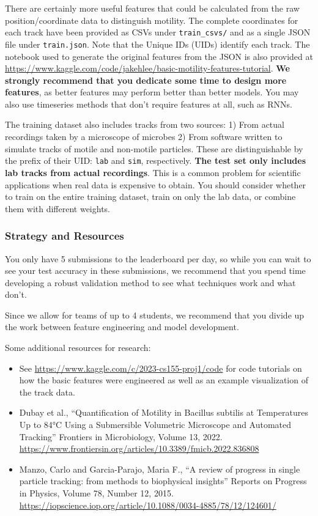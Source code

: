 There are certainly more useful features that could be calculated from the raw position/coordinate data to distinguish motility. The complete coordinates for each track have been provided as CSVs under \texttt{train_csvs/} and as a single JSON file under \texttt{train.json}. Note that the Unique IDs (UIDs) identify each track. The notebook used to generate the original features from the JSON is also provided at \url{https://www.kaggle.com/code/jakehlee/basic-motility-features-tutorial}. \textbf{We strongly recommend that you dedicate some time to design more features}, as better features may perform better than better models. You may also use timeseries methods that don't require features at all, such as RNNs.

The training dataset also includes tracks from two sources: 1) From actual recordings taken by a microscope of microbes 2) From software written to simulate tracks of motile and non-motile particles. These are distinguishable by the prefix of their UID: \texttt{lab} and \texttt{sim}, respectively. \textbf{The test set only includes lab tracks from actual recordings}. This is a common problem for scientific applications when real data is expensive to obtain. You should consider whether to train on the entire training dataset, train on only the lab data, or combine them with different weights.

\subsubsection{Strategy and Resources}

You only have 5 submissions to the leaderboard per day, so while you can wait to see your test accuracy in these submissions, we recommend that you spend time developing a robust validation method to see what techniques work and what don't.

Since we allow for teams of up to 4 students, we recommend that you divide up the work between feature engineering and model development.

Some additional resources for research:
\begin{itemize}
\item See \url{https://www.kaggle.com/c/2023-cs155-proj1/code} for code tutorials on how the basic features were engineered as well as an example visualization of the track data.
\item Dubay et al., ``Quantification of Motility in Bacillus subtilis at Temperatures Up to 84°C Using a Submersible Volumetric Microscope and Automated Tracking'' Frontiers in Microbiology, Volume 13, 2022. \url{https://www.frontiersin.org/articles/10.3389/fmicb.2022.836808}
\item Manzo, Carlo and Garcia-Parajo, Maria F., ``A review of progress in single particle tracking: from methods to biophysical insights'' Reports on Progress in Physics, Volume 78, Number 12, 2015. \url{https://iopscience.iop.org/article/10.1088/0034-4885/78/12/124601/}
\end{itemize}


